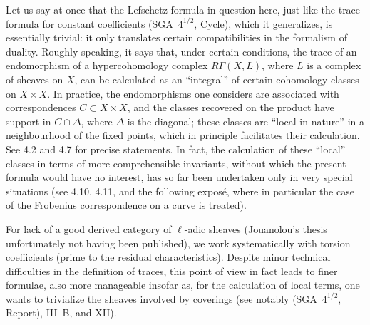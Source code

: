 Let us say at once that the Lefschetz formula in question here, just like the trace formula for constant coefficients (SGA~$4^{1/2}$, Cycle), which it generalizes, is essentially trivial: it only translates certain compatibilities in the formalism of duality. Roughly speaking, it says that, under certain conditions, the trace of an endomorphism of a hypercohomology complex $R\Gamma(X,L)$, where $L$ is a complex of sheaves on $X$, can be calculated as an ``integral'' of certain cohomology classes on $X\times X$. In practice, the endomorphisms one considers are associated with correspondences $C\subset X\times X$, and the classes recovered on the product have support in $C\cap\Delta$, where $\Delta$ is the diagonal; these classes are ``local in nature'' in a neighbourhood of the fixed points, which in principle facilitates their calculation. See 4.2 and 4.7 for precise statements. In fact, the calculation of these ``local'' classes in terms of more comprehensible invariants, without which the present formula would have no interest, has so far been undertaken only in very special situations (see 4.10, 4.11, and the following exposé, where in particular the case of the Frobenius correspondence on a curve is treated).

For lack of a good derived category of $\ell$-adic sheaves (Jouanolou's thesis unfortunately not having been published), we work systematically with torsion coefficients (prime to the residual characteristics). Despite minor technical difficulties in the definition of traces, this point of view in fact leads to finer formulae, also more manageable insofar as, for the calculation of local terms, one wants to trivialize the sheaves involved by coverings (see notably (SGA~$4^{1/2}$, Report), III~B, and XII).

